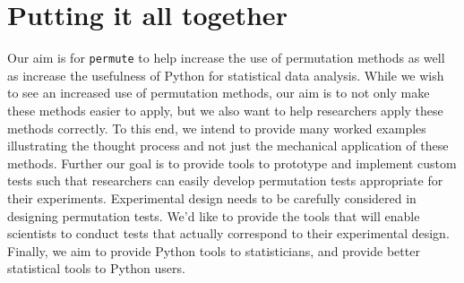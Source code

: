 \section{Putting it all together}

Our aim is for \texttt{permute} to help increase the use of permutation methods
as well as increase the usefulness of Python for statistical data analysis.
While we wish to see an increased use of permutation methods, our aim is to not
only make these methods easier to apply, but we also want to help researchers
apply these methods correctly.  To this end, we intend to provide
many worked examples illustrating the thought process and not just the mechanical
application of these methods.  Further our goal is to provide tools to
prototype and implement custom tests such that researchers can easily develop
permutation tests appropriate for their experiments.  Experimental design needs
to be carefully considered in designing permutation tests. We'd like to provide
the tools that will enable scientists to conduct tests that actually correspond
to their experimental design.  Finally, we aim to provide Python tools to
statisticians, and provide better statistical tools to Python users.
